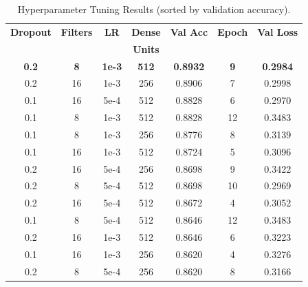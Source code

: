 \documentclass[conference]{IEEEtran}
\begin{document}
\begin{table}[htbp]
	\caption{Hyperparameter Tuning Results (sorted by validation accuracy).}
	\label{table:hp_results}
	\centering
	\begin{adjustbox}{width=0.48\textwidth}
		\begin{tabular}{|c|c|c|c|c|c|c|}
			\hline
			\textbf{Dropout} & \textbf{Filters} & \textbf{LR} & \textbf{Dense} & \textbf{Val Acc} & \textbf{Epoch} & \textbf{Val Loss} \\
			& & & \textbf{Units} & & & \\
			\hline
			\rowcolor{yellow}
			\bfseries 0.2 & \bfseries 8  & \bfseries 1e-3 & \bfseries 512 & \bfseries 0.8932 & \bfseries 9  & \bfseries 0.2984 \\
			0.2           & 16           & 1e-3            & 256           & 0.8906           & 7            & 0.2998           \\
			0.1           & 16           & 5e-4            & 512           & 0.8828           & 6            & 0.2970           \\
			0.1           & 8            & 1e-3            & 512           & 0.8828           & 12           & 0.3483           \\
			0.1           & 8            & 1e-3            & 256           & 0.8776           & 8            & 0.3139           \\
			0.1           & 16           & 1e-3            & 512           & 0.8724           & 5            & 0.3096           \\
			0.2           & 16           & 5e-4            & 256           & 0.8698           & 9            & 0.3422           \\
			0.2           & 8            & 5e-4            & 512           & 0.8698           & 10           & 0.2969           \\
			0.2           & 16           & 5e-4            & 512           & 0.8672           & 4            & 0.3052           \\
			0.1           & 8            & 5e-4            & 512           & 0.8646           & 12           & 0.3483           \\
			0.2           & 16           & 1e-3            & 512           & 0.8646           & 6            & 0.3223           \\
			0.1           & 16           & 1e-3            & 256           & 0.8620           & 4            & 0.3276           \\
			0.2           & 8            & 5e-4            & 256           & 0.8620           & 8            & 0.3166           \\

\end{tabular}
\end{adjustbox}
\end{table}
\end{document}
